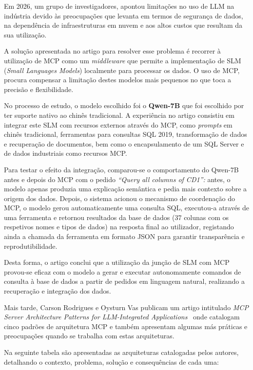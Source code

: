 
Em 2026, um grupo de investigadores, apontou limitações no uso de LLM na indústria devido às preocupações que levanta em termos de segurança de dados, na dependência de infraestruturas em nuvem e aos altos custos que resultam da sua utilização.~\cite{hu2026applying}

A solução apresentada no artigo para resolver esse problema é recorrer à utilização de MCP como um \textit{middleware} que permite a implementação de SLM (\textit{Small Languages Models}) localmente para processar os dados. O uso de MCP, procura compensar a limitação destes modelos mais pequenos no que toca a precisão e flexibilidade.

No processo de estudo, o modelo escolhido foi o \textbf{Qwen-7B} que foi escolhido por ter suporte nativo ao chinês tradicional. A experiência no artigo consistiu em integrar este SLM com recursos externos através do MCP, como \textit{prompts} em chinês tradicional, ferramentas para consultas SQL 2019, transformação de dados e recuperação de documentos, bem como o encapsulamento de um SQL Server e de dados industriais como recursos MCP.

Para testar o efeito da integração, comparou-se o comportamento do Qwen-7B antes e depois do MCP com o pedido \emph{“Query all columns of CD1”:} antes, o modelo apenas produzia uma explicação semântica e pedia mais contexto sobre a origem dos dados. Depois, o sistema acionou o mecanismo de coordenação do MCP, o modelo gerou automaticamente uma consulta SQL, executou-a através de uma ferramenta e retornou resultados da base de dados (37 colunas com os respetivos nomes e tipos de dados) na resposta final ao utilizador, registando ainda a chamada da ferramenta em formato JSON para garantir transparência e reprodutibilidade.

Desta forma, o artigo conclui que a utilização da junção de SLM com MCP provou-se eficaz com o modelo a gerar e executar autonomamente comandos de consulta à base de dados a partir de pedidos em linguagem natural, realizando a recuperação e integração dos dados.~\cite{hu2026applying}

Mais tarde, Carson Rodrigues e Oysturn Vas publicam um artigo intitulado \emph{MCP Server Architecture Patterns for LLM-Integrated Applications}~\cite{rodrigues2026mcp} onde catalogam cinco padrões de arquitetura MCP e também apresentam algumas más práticas e preocupações quando se trabalha com estas arquiteturas.


Na seguinte tabela são apresentadas as arquiteturas catalogadas pelos autores, detalhando o contexto, problema, solução e consequências de cada uma:


